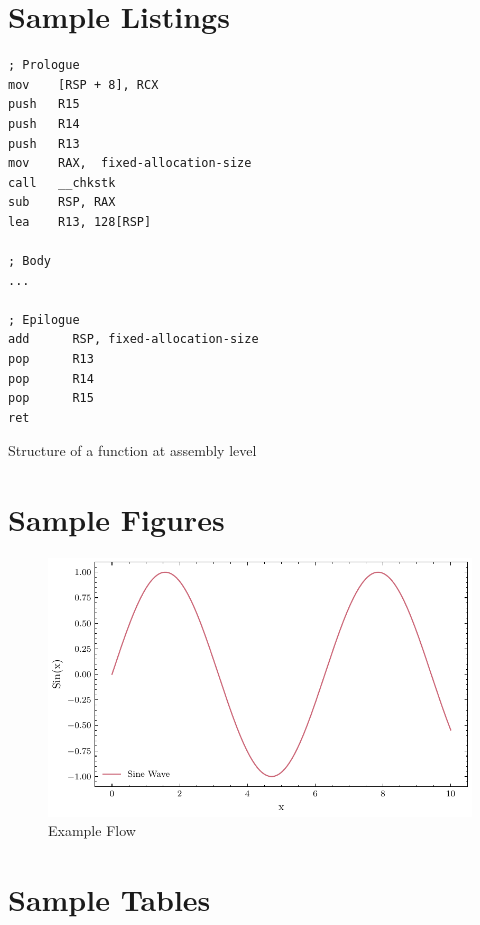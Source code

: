 \section{Sample Listings}
\label{s:Listings}

\begin{listing}
\begin{verbatim}
; Prologue
mov    [RSP + 8], RCX
push   R15
push   R14
push   R13
mov    RAX,  fixed-allocation-size
call   __chkstk
sub    RSP, RAX
lea    R13, 128[RSP]

; Body
...

; Epilogue
add      RSP, fixed-allocation-size
pop      R13
pop      R14
pop      R15
ret
\end{verbatim}
\caption{Structure of a function at assembly level \cite{microsoft_corp_x64_2021}}
\label{listing:prolog-epilogl}
\end{listing}

\newpage

\section{Sample Figures}
\label{s:Figures}

\begin{figure}[ht]
\centering
\includegraphics[width=\textwidth,height=\textheight,keepaspectratio]{Python_plotting_example/example_1.pdf}
\caption{Example Flow}
\end{figure}


\newpage

\section{Sample Tables}
\label{s:Tables}

